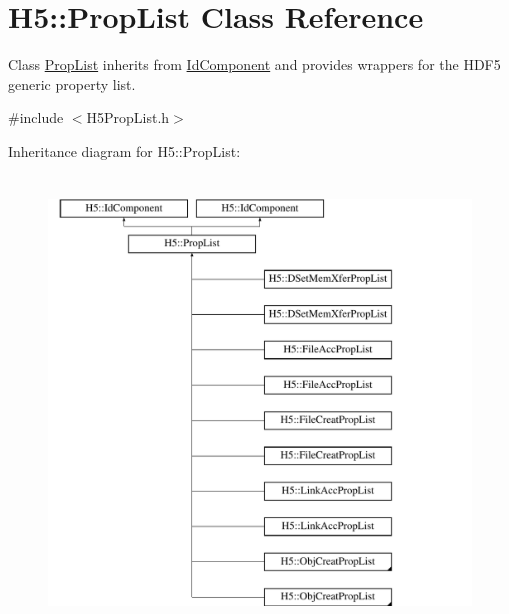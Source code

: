 \hypertarget{class_h5_1_1_prop_list}{}\section{H5\+:\+:Prop\+List Class Reference}
\label{class_h5_1_1_prop_list}


Class \hyperlink{class_h5_1_1_prop_list}{Prop\+List} inherits from \hyperlink{class_h5_1_1_id_component}{Id\+Component} and provides wrappers for the H\+D\+F5 generic property list.  




{\ttfamily \#include $<$H5\+Prop\+List.\+h$>$}

Inheritance diagram for H5\+:\+:Prop\+List\+:\begin{figure}[H]
\begin{center}
\leavevmode
\includegraphics[height=12.000000cm]{class_h5_1_1_prop_list}
\end{center}
\end{figure}
